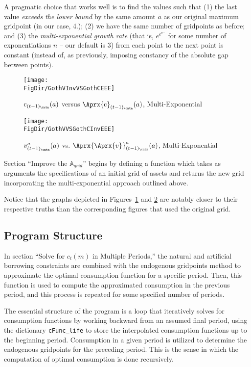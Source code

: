 \documentclass[titlepage, headings=optiontotocandhead]{Resources/texmf-local/tex/latex/econtex}
\begin{document}
A pragmatic choice that works well is to find the values such that (1) the last value \textit{exceeds the lower bound} by the same amount $\bar a$ as our original maximum gridpoint (in our case, 4.); (2) we have the same number of gridpoints as before; and (3) the \textit{multi-exponential growth rate} (that is, $e^{e^{e^{...}}}$ for some number of exponentiations $n$ -- our default is 3) from each point to the next point is constant (instead of, as previously, imposing constancy of the absolute gap between points).

\hypertarget{GothVInvVSGothCEEE}{}
\begin{figure}
  \centerline{\texttt{[image: \\FigDir/GothVInvVSGothCEEE]}}
  \caption{$\cFunc_{(t-1)_\cntn}(a)$ versus
    $\Aprx{\cFunc}_{(t-1)_\cntn}(a)$, Multi-Exponential }
  \label{fig:GothVInvVSGothCEE}
\end{figure}


\hypertarget{GothVVSGothCInvEEE}{}
\begin{figure}
  \texttt{[image: \\FigDir/GothVVSGothCInvEEE]}
  \caption{$v^{a}_{(t-1)_\cntn}(a)$ vs.
    $\Aprx{\Aprx{v}}_{(t-1)_\cntn}^{a}(a)$, Multi-Exponential }
  \label{fig:GothVVSGothCInvEE}
\end{figure}

Section ``Improve the $\mathbb{A}_{grid}$'' begins by defining a function which takes as arguments the specifications of an initial grid of assets and returns the new grid incorporating the multi-exponential approach outlined above.


Notice that the graphs depicted in Figures~\ref{fig:GothVInvVSGothCEE} and \ref{fig:GothVVSGothCInvEE} are notably closer to their respective truths than the corresponding figures that used the original grid.

\subsection{Program Structure}

In section ``Solve for $c_t(m)$ in Multiple Periods,'' the natural and artificial borrowing constraints are combined with the endogenous gridpoints method to approximate the optimal consumption function for a specific period. Then, this function is used to compute the approximated consumption in the previous period, and this process is repeated for some specified number of periods.

The essential structure of the program is a loop that iteratively solves for consumption functions by working backward from an assumed final period, using the dictionary \texttt{cFunc\_life} to store the interpolated consumption functions up to the beginning period. Consumption in a given period is utilized to determine the endogenous gridpoints for the preceding period. This is the sense in which the computation of optimal consumption is done recursively.
\end{document}
